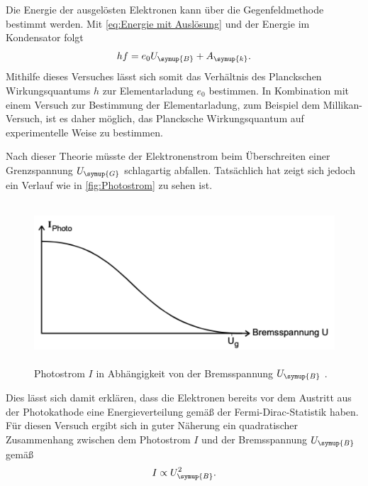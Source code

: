Die Energie der ausgelösten Elektronen kann über die Gegenfeldmethode bestimmt werden. Mit \eqref{eq:Energie mit Auslösung} und der Energie
im Kondensator folgt
\begin{equation}
    hf = e_0U_{\symup{B}} + A_{\symup{k}}. \label{eq:Energie Photoelektronen}
\end{equation}
Mithilfe dieses Versuches lässt sich somit das Verhältnis des Planckschen Wirkungsquantums $h$ zur Elementarladung $e_0$ bestimmen. In Kombination
mit einem Versuch zur Bestimmung der Elementarladung, zum Beispiel dem Millikan-Versuch, ist es daher möglich, das Plancksche Wirkungsquantum 
auf experimentelle Weise zu bestimmen.

Nach dieser Theorie müsste der Elektronenstrom beim Überschreiten einer Grenzspannung $U_{\symup{G}}$ schlagartig abfallen. Tatsächlich hat zeigt sich
jedoch ein Verlauf wie in \autoref{fig:Photostrom} zu sehen ist.
\begin{figure}
    \centering
    \includegraphics[height=6cm]{content/pics/Photostrom.pdf}
    \caption{Photostrom $I$ in Abhängigkeit von der Bremsspannung $U_{\symup{B}}$ \cite{v500}.}
    \label{fig:Photostrom}
\end{figure}
Dies lässt sich damit erklären, dass die Elektronen bereits vor dem Austritt aus der Photokathode eine Energieverteilung gemäß der
Fermi-Dirac-Statistik haben. Für diesen Versuch ergibt sich in guter Näherung ein quadratischer Zusammenhang zwischen dem Photostrom $I$ und
der Bremsspannung $U_{\symup{B}}$ gemäß
\begin{equation*}
    I \propto U_{\symup{B}}^2.
\end{equation*}
